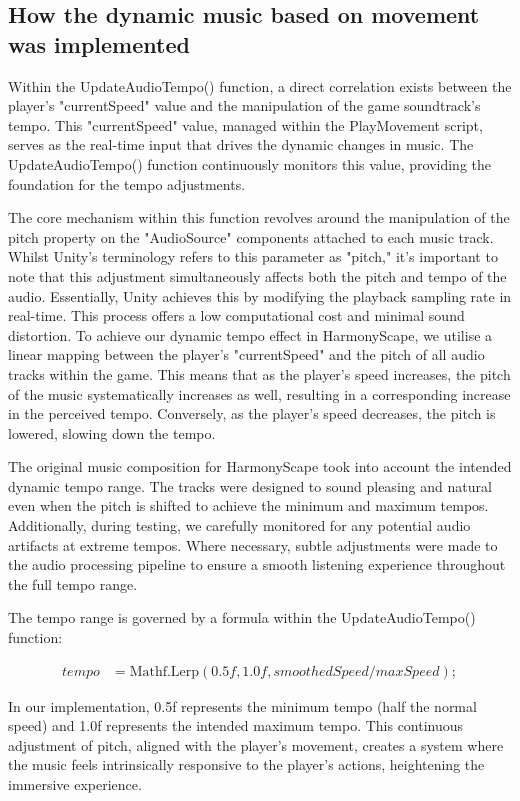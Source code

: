 \documentclass{l4proj}
\begin{document}
\subsection{How the dynamic music based on movement was implemented} 
Within the UpdateAudioTempo() function, a direct correlation exists between the player's "currentSpeed" value and the manipulation of the game soundtrack's tempo. This "currentSpeed" value, managed within the PlayMovement script, serves as the real-time input that drives the dynamic changes in music. The UpdateAudioTempo() function continuously monitors this value, providing the foundation for the tempo adjustments.

The core mechanism within this function revolves around the manipulation of the pitch property on the "AudioSource" components attached to each music track. Whilst Unity's terminology refers to this parameter as "pitch," it's important to note that this adjustment simultaneously affects both the pitch and tempo of the audio. Essentially, Unity achieves this by modifying the playback sampling rate in real-time. This process offers a low computational cost and minimal sound distortion. To achieve our dynamic tempo effect in HarmonyScape, we utilise a linear mapping between the player's "currentSpeed" and the pitch of all audio tracks within the game. This means that as the player's speed increases, the pitch of the music systematically increases as well, resulting in a corresponding increase in the perceived tempo. Conversely, as the player's speed decreases, the pitch is lowered, slowing down the tempo.

The original music composition for HarmonyScape took into account the intended dynamic tempo range. The tracks were designed to sound pleasing and natural even when the pitch is shifted to achieve the minimum and maximum tempos. Additionally, during testing, we carefully monitored for any potential audio artifacts at extreme tempos. Where necessary, subtle adjustments were made to the audio processing pipeline to ensure a smooth listening experience throughout the full tempo range.

The tempo range is governed by a formula within the UpdateAudioTempo() function:

\begin{align*}
tempo &= \text{Mathf.Lerp}(0.5f, 1.0f, smoothedSpeed / maxSpeed);
\end{align*}

In our implementation, 0.5f represents the minimum tempo (half the normal speed) and 1.0f represents the intended maximum tempo. This continuous adjustment of pitch, aligned with the player's movement, creates a system where the music feels intrinsically responsive to the player's actions, heightening the immersive experience.
\end{document}
